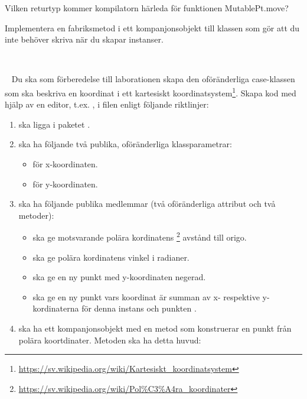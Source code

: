 \Subtask Vilken returtyp kommer kompilatorn härleda för funktionen MutablePt.move?

\Subtask Implementera en fabriksmetod  i ett kompanjonsobjekt till klassen  som gör att du inte behöver skriva  när du skapar instanser.

\SOLUTION

\TaskSolved \what~\TODO


\QUESTEND



\QUESTBEGIN

\Task \what~
Du ska som förberedelse till laborationen skapa den oföränderliga case-klassen  som ska beskriva en koordinat i ett kartesiskt koordinatsystem\footnote{\url{https://sv.wikipedia.org/wiki/Kartesiskt_koordinatsystem}}. Skapa kod med hjälp av en editor, t.ex. , i filen   enligt följande riktlinjer:
\begin{enumerate}[noitemsep]
\item {} ska ligga i paketet .

\item {} ska ha följande två publika, oföränderliga klassparametrar:
\begin{itemize}[nolistsep, noitemsep]
\item {} för x-koordinaten.
\item {} för y-koordinaten.
\end{itemize}

\item {} ska ha följande publika medlemmar (två oföränderliga attribut och två metoder):
\begin{itemize}[nolistsep, noitemsep]
\item {} ska ge motsvarande polära kordinatens%
\footnote{\url{https://sv.wikipedia.org/wiki/Pol\%C3\%A4ra\_koordinater}}
 avstånd till origo.
\item {} ska ge polära kordinatens vinkel i radianer.
\item {} ska ge en ny punkt med y-koordinaten negerad.
\item {} ska ge en ny punkt vars koordinat är summan av x- respektive y-kordinaterna för denna instans och punkten .
\end{itemize}

\item {} ska ha ett kompanjonsobjekt med en metod som konstruerar en punkt från polära koortdinater. Metoden ska ha detta huvud: \\

\end{enumerate}

